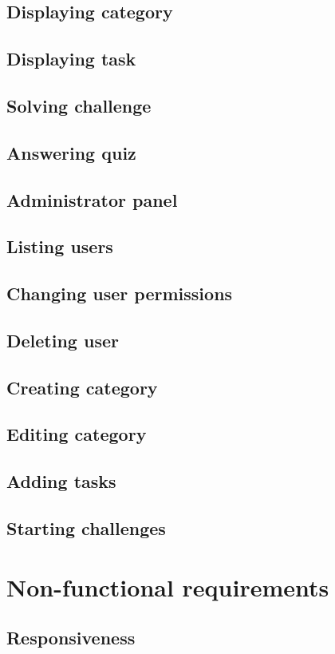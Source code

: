 \subsection{Displaying category}
\subsection{Displaying task}
\subsection{Solving challenge}
\subsection{Answering quiz}
\subsection{Administrator panel}
\subsection{Listing users}
\subsection{Changing user permissions}
\subsection{Deleting user}
\subsection{Creating category}
\subsection{Editing category}
\subsection{Adding tasks}
\subsection{Starting challenges}

\section{Non-functional requirements}

\subsection{Responsiveness}

